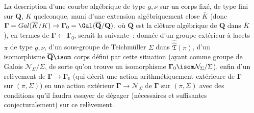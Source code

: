 La description d'une courbe algébrique de type $g,\nu$ sur un corps fixé, de type fini sur $\mathbf{Q}$, $K$ quelconque, muni d'une extension algébriquement close $\overline K$ (donc $\boldsymbol{\Gamma}={Gal}(\overline K/K)\to \boldsymbol{\Gamma}_0={\Gal}(\overline{\mathbf{Q}}/\mathbf{Q})$, où $\overline{\mathbf{Q}}$ est la clôture algébrique de $\mathbf{Q}$ dans $\overline K$), en termes de $\boldsymbol{\Gamma}\leftarrow\boldsymbol{\Gamma}_0$, serait la suivante~: donnée d'un groupe extérieur à lacets $\pi$ de type $g,\nu$, d'un sous-groupe de Teichmüller $\Sigma$ dans $\hat{\hat{\mathfrak{T}}}(\pi)$, d'un isomorphisme $\overline{\mathbf{Q}} \isom $ corps défini par cette situation (ayant comme groupe de Galois $\mathcal{N}_\Sigma/\Sigma$, de sorte qu'on trouve un isomorphisme $\boldsymbol{\Gamma}_0 \isom \mathcal{N}_\Sigma/\Sigma$), enfin d'un relèvement de $\boldsymbol{\Gamma}\to\boldsymbol{\Gamma}_0$ (qui décrit une action arithmétiquement extérieure de $\boldsymbol{\Gamma}$ sur $(\pi,\Sigma)$) en une action extérieur $\boldsymbol{\Gamma}\to\mathcal{N}_\Sigma$ de $\boldsymbol{\Gamma}$ sur $(\pi,\Sigma)$ avec des conditions qu'il faudra essayer de dégager (nécessaires et suffisantes conjecturalement) sur ce relèvement.

